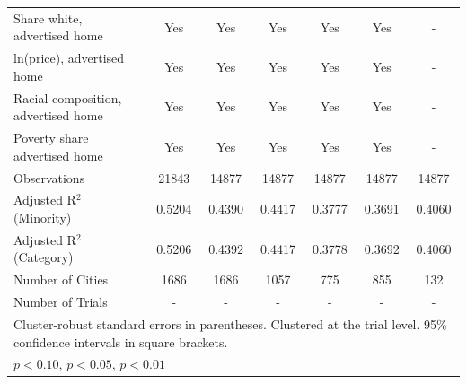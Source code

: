 \begin{table}[htbp]
{\begin{tabular}{l*{6}{c}}
\midrule
Share white, advertised home  & Yes & Yes & Yes & Yes & Yes & - \\
ln(price), advertised home  & Yes & Yes & Yes & Yes & Yes & - \\
Racial composition, advertised home & Yes & Yes & Yes & Yes & Yes & - \\
Poverty share advertised home & Yes & Yes & Yes & Yes & Yes & - \\
Observations & 21843 & 14877 & 14877 & 14877 & 14877 & 14877 \\
Adjusted R$^2$ (Minority) & 0.5204 & 0.4390 & 0.4417 & 0.3777 & 0.3691 & 0.4060 \\
Adjusted R$^2$ (Category) & 0.5206 & 0.4392 & 0.4417 & 0.3778 & 0.3692 & 0.4060 \\
Number of Cities & 1686 & 1686 & 1057 & 775 & 855 & 132 \\
Number of Trials & - & - & - & - & - & - \\
\bottomrule
\multicolumn{7}{l}{\footnotesize Cluster-robust standard errors in parentheses. Clustered at the trial level. 95\% confidence intervals in square brackets.}\\
\multicolumn{7}{l}{\footnotesize \sym{*} \(p<0.10\), \sym{**} \(p<0.05\), \sym{***} \(p<0.01\)}\\
\end{tabular}
}
\end{table}
